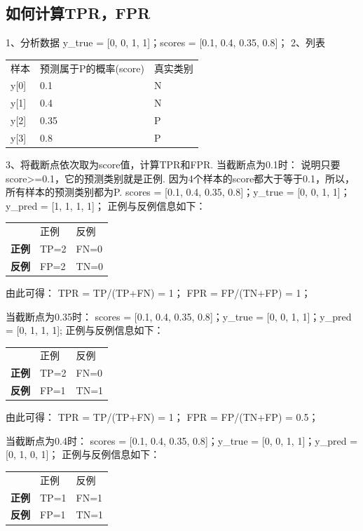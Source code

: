 
\subsection{如何计算TPR，FPR}\label{ux5982ux4f55ux8ba1ux7b97tprfpr}

1、分析数据 y\_true = {[}0, 0, 1, 1{]}；scores = {[}0.1, 0.4, 0.35,
0.8{]}； 2、列表

\begin{longtable}[]{ lll }
样本 & 预测属于P的概率(score) & 真实类别\tabularnewline
y{[}0{]} & 0.1 & N\tabularnewline
y{[}1{]} & 0.4 & N\tabularnewline
y{[}2{]} & 0.35 & P\tabularnewline
y{[}3{]} & 0.8 & P\tabularnewline
\end{longtable}

3、将截断点依次取为score值，计算TPR和FPR. 当截断点为0.1时：
说明只要score\textgreater{}=0.1，它的预测类别就是正例.
因为4个样本的score都大于等于0.1，所以，所有样本的预测类别都为P. scores
= {[}0.1, 0.4, 0.35, 0.8{]}；y\_true = {[}0, 0, 1, 1{]}；y\_pred = {[}1,
1, 1, 1{]}； 正例与反例信息如下：

\begin{longtable}[]{ lll }
& 正例 & 反例\tabularnewline
\textbf{正例} & TP=2 & FN=0\tabularnewline
\textbf{反例} & FP=2 & TN=0\tabularnewline
\end{longtable}

由此可得： TPR = TP/(TP+FN) = 1； FPR = FP/(TN+FP) = 1；

当截断点为0.35时： scores = {[}0.1, 0.4, 0.35, 0.8{]}；y\_true = {[}0,
0, 1, 1{]}；y\_pred = {[}0, 1, 1, 1{]}; 正例与反例信息如下：

\begin{longtable}[]{ lll }
& 正例 & 反例\tabularnewline
\textbf{正例} & TP=2 & FN=0\tabularnewline
\textbf{反例} & FP=1 & TN=1\tabularnewline
\end{longtable}

由此可得： TPR = TP/(TP+FN) = 1； FPR = FP/(TN+FP) = 0.5；

当截断点为0.4时： scores = {[}0.1, 0.4, 0.35, 0.8{]}；y\_true = {[}0, 0,
1, 1{]}；y\_pred = {[}0, 1, 0, 1{]}； 正例与反例信息如下：

\begin{longtable}[]{ lll }
& 正例 & 反例\tabularnewline
\textbf{正例} & TP=1 & FN=1\tabularnewline
\textbf{反例} & FP=1 & TN=1\tabularnewline
\end{longtable}

